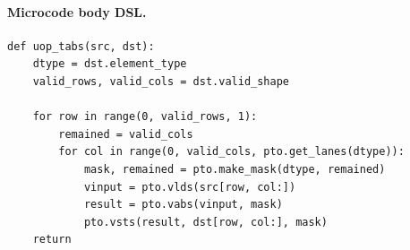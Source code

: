 \paragraph{Microcode body DSL.}
\begin{lstlisting}[style=ptocode]
def uop_tabs(src, dst):
    dtype = dst.element_type
    valid_rows, valid_cols = dst.valid_shape

    for row in range(0, valid_rows, 1):
        remained = valid_cols
        for col in range(0, valid_cols, pto.get_lanes(dtype)):
            mask, remained = pto.make_mask(dtype, remained)
            vinput = pto.vlds(src[row, col:])
            result = pto.vabs(vinput, mask)
            pto.vsts(result, dst[row, col:], mask)
    return
\end{lstlisting}
\Needspace{0.34\textheight}
